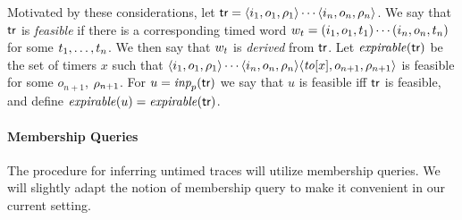 
Motivated by these considerations,
let $\textsf{tr} = \langle i_1,o_1,\rho_1\rangle\cdots\langle i_n,o_n,\rho_n\rangle$.
We say that $\textsf{tr}$ is {\em feasible} if 
there is a corresponding timed word
$w_t = (i_1, o_1, t_1) \cdots (i_n, o_n, t_n)$ for some ${t}_1 , \ldots , {t}_{n}$.
We then say that $w_t$ is {\em derived} from $\textsf{tr}$.
Let $\mathit{expirable}(\textsf{tr})$ be the set of timers $x$ such that
$\langle i_1,o_1,\rho_1\rangle\cdots\langle i_n,o_n,\rho_n\rangle
\langle \mathit{to}[x],o_{n+1},\rho_{n+1}\rangle$
is feasible for some $o_{n+1}$, $\rho_{n+1}$.
For $u = \textit{inp}_p(\textsf{tr})$ we say that $u$ is feasible iff $\textsf{tr}$ is
feasible, and define $\mathit{expirable}(u) = \mathit{expirable}(\textsf{tr})$.


\paragraph{Membership Queries}
The procedure for inferring untimed traces will utilize membership queries.
We will slightly adapt the notion of membership query to make it convenient
in our current setting.

